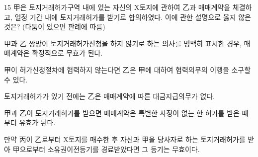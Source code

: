 \begin{question}{15}
甲은 토지거래허가구역 내에 있는 자신의 X토지에 관하여 乙과 매매계약을 체결하고, 일정 기간 내에 토지거래허가를 받기로 합의하였다. 이에 관한 설명으로 옳지 않은 것은? (다툼이 있으면 판례에 따름)
\begin{choices}
  \item 甲과 乙 쌍방이 토지거래허가신청을 하지 않기로 하는 의사를 명백히 표시한 경우, 매매계약은 확정적으로 무효가 된다.
  \item 甲이 허가신청절차에 협력하지 않는다면 乙은 甲에 대하여 협력의무의 이행을 소구할 수 있다.
  \item 토지거래허가가 있기 전에는 乙은 매매계약에 따른 대금지급의무가 없다.
  \item 甲과 乙이 토지거래허가를 받으면 매매계약은 특별한 사정이 없는 한 허가를 받은 때부터 유효가 된다.
  \item 만약 丙이 乙로부터 X토지를 매수한 후 자신과 甲을 당사자로 하는 토지거래허가를 받아 甲으로부터 소유권이전등기를 경료받았다면 그 등기는 무효이다.
\end{choices}
\end{question}
